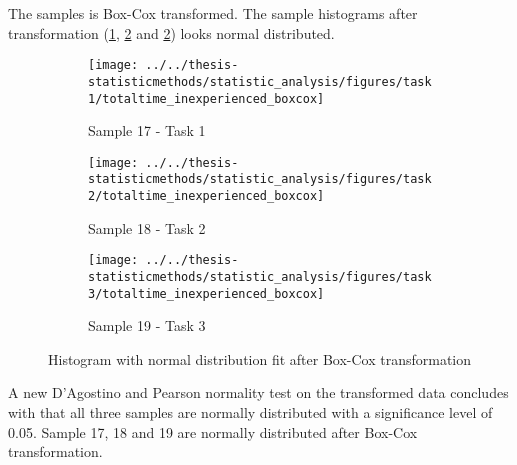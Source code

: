 The samples is Box-Cox transformed. The sample histograms after transformation (\ref{fig:totaltimeinexperiencedboxcox_task1}, \ref{fig:totaltimeinexperiencedboxcox_task2} and \ref{fig:totaltimeinexperiencedboxcox_task2}) looks normal distributed. 

\begin{figure}[H]
	\centering
	\begin{subfigure}[b]{0.32\textwidth}
		\centering
		\texttt{[image: ../../thesis-statisticmethods/statistic\_analysis/figures/task1/totaltime\_inexperienced\_boxcox]}
		\caption{Sample 17 - Task 1}
		\label{fig:totaltimeinexperiencedboxcox_task1}
	\end{subfigure}
	\begin{subfigure}[b]{0.32\textwidth}
		\centering
		\texttt{[image: ../../thesis-statisticmethods/statistic\_analysis/figures/task2/totaltime\_inexperienced\_boxcox]}
		\caption{Sample 18 - Task 2}
		\label{fig:totaltimeinexperiencedboxcox_task2}
	\end{subfigure}
	\begin{subfigure}[b]{0.32\textwidth}
		\centering
		\texttt{[image: ../../thesis-statisticmethods/statistic\_analysis/figures/task3/totaltime\_inexperienced\_boxcox]}
		\caption{Sample 19 - Task 3}
		\label{fig:totaltimeinexperiencedboxcox_task3}
	\end{subfigure}
	\caption{Histogram with normal distribution fit after Box-Cox transformation}
\end{figure}

A new D'Agostino and Pearson normality test on the transformed data concludes with that all three samples are normally distributed with a significance level of 0.05. Sample 17, 18 and 19 are normally distributed after Box-Cox transformation. \\[0.2cm]

